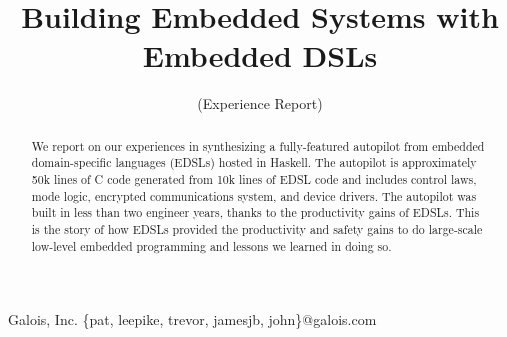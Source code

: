 \documentclass[preprint]{sigplanconf}
\begin{document}
\setlength{\pdfpageheight}{\paperheight}
\setlength{\pdfpagewidth}{\paperwidth}






\title{Building Embedded Systems with Embedded DSLs}
\subtitle{(Experience Report)}

           {Galois, Inc.}
           {\{pat, leepike, trevor, jamesjb, john\}@galois.com}

\maketitle

\begin{abstract}
We report on our experiences in synthesizing a fully-featured autopilot from
embedded domain-specific languages (EDSLs) hosted in Haskell.  The autopilot is
approximately 50k lines of C code generated from 10k lines of EDSL code and
includes control laws, mode logic, encrypted communications system, and device
drivers.  The autopilot was built in less than two engineer years, thanks to the
productivity gains of EDSLs.  This is the story of how EDSLs provided the
productivity and safety gains to do large-scale low-level embedded programming
and lessons we learned in doing so.
\end{abstract}


\end{document}
